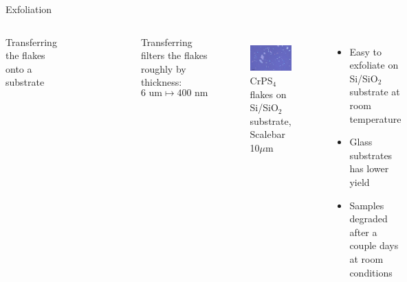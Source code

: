 \documentclass[
	10pt,
]{beamer}
\begin{document}
\begin{frame}{Exfoliation}
\begin{columns}
		Transferring the flakes onto a substrate
		\begin{figure}
			\centering
			\includegraphics[width=\textwidth]{../../photos/exfoliation glass.jpg}
		\end{figure}
		Transferring filters the flakes roughly by thickness:\\ 
		$$6\text{ um} \mapsto 400\text{ nm}$$

		\begin{figure}
			\includegraphics[width=\textwidth]{../../data/2023-12-04_LO_MG_NiPS3/CrPS4_50x_10um.png}\\
			CrPS$_\text{4}$ flakes on Si/SiO$_\text{2}$ substrate, Scalebar 10$\mu$m
		\end{figure}
		
		\begin{itemize}
			\item Easy to exfoliate on Si/SiO$_2$ substrate at room temperature
			\item Glass substrates has lower yield
			\item Samples degraded after a couple days at room conditions
		\end{itemize}
	\end{columns}
\end{frame}
\end{document}
